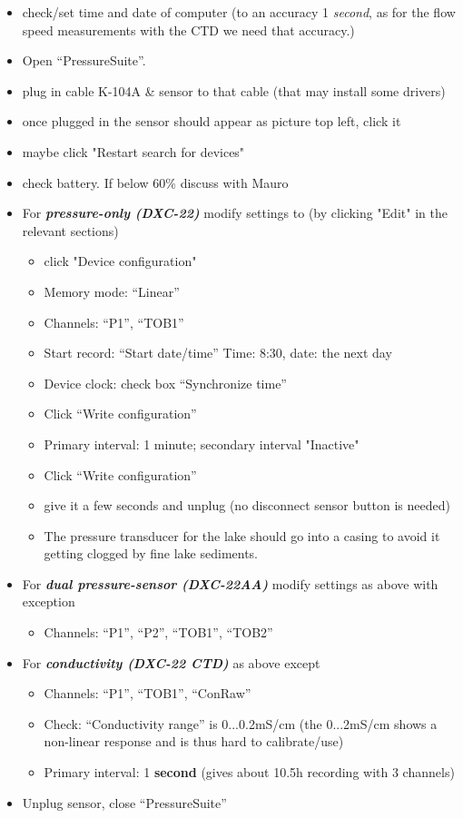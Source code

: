 \documentclass[DIV=15,halfparskip,11pt,headinclude]{scrartcl}
\begin{document}
\begin{itemize}
  \item check/set time and date of computer (to an accuracy 1
    \emph{second}, as for the flow speed measurements with the CTD we
    need that accuracy.)
  \item Open ``PressureSuite''.
  \item plug in cable K-104A \& sensor to that cable (that may install some drivers)
  \item once plugged in the sensor should appear as picture top left, click it
  \item maybe click "Restart search for devices"
  \item check battery. If below 60\% discuss with Mauro
\item For \emph{\bf pressure-only (DXC-22)} modify settings to (by clicking "Edit" in the relevant sections)
  \begin{itemize}
  \item click "Device configuration"
  \item Memory mode: ``Linear''
  \item Channels: ``P1'', ``TOB1''
  \item Start record: ``Start date/time''
    Time: 8:30, date: the next day
  \item Device clock: check box ``Synchronize time''
  \item Click ``Write configuration''
  \item Primary interval: 1 minute; secondary interval "Inactive"
  \item Click ``Write configuration''
  \item give it a few seconds and unplug (no disconnect sensor button is needed)
  \item The pressure transducer for the lake should go into a casing to avoid it getting clogged by fine lake sediments.
\end{itemize}
\item For \emph{\bf dual pressure-sensor (DXC-22AA)} modify settings as above with exception
  \begin{itemize}
\item Channels: ``P1'', ``P2'', ``TOB1'', ``TOB2''
\end{itemize}
\item For \emph{\bf conductivity (DXC-22 CTD)} as above except
  \begin{itemize}
\item Channels: ``P1'', ``TOB1'', ``ConRaw''
  \item Check: ``Conductivity range'' is 0...0.2mS/cm (the
    0...2mS/cm shows a non-linear response and is thus hard to
    calibrate/use)
\item Primary interval: 1 \textbf{second} (gives about 10.5h recording
  with 3 channels)
\end{itemize}

\item Unplug sensor, close ``PressureSuite''
\end{itemize}
\end{document}
